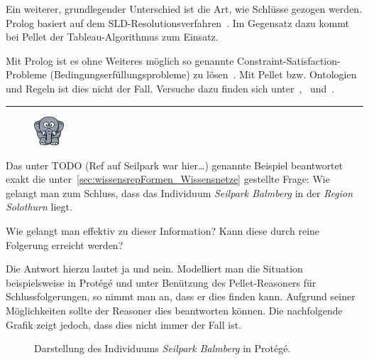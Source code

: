 Ein weiterer, grundlegender Unterschied ist die Art, wie Schlüsse gezogen werden. Prolog basiert auf dem SLD-Resolutionsverfahren~\citep[Details siehe][Seite 68]{laemmel}. Im Gegensatz dazu kommt bei Pellet der Tableau-Algorithmus zum Einsatz.

Mit Prolog ist es ohne Weiteres möglich so genannte Constraint-Satisfaction-Probleme (Bedingungserfüllungsprobleme) zu lösen~\citep[Details siehe][Seite 148]{laemmel}. Mit Pellet bzw. Ontologien und Regeln ist dies nicht der Fall. Versuche dazu finden sich unter~\citet{xiong2008constraint},~\citet{staab2006constraint} und~\citet{bramer2007constraint}.

\noindent\rule[1ex]{\textwidth}{1pt}
\begin{figure}
    \vspace{-12pt}
    \includegraphics[width=0.1\textwidth]{bilder/elephant.png}
\end{figure}
Das unter TODO (Ref auf Seilpark war hier\ldots) genannte Beispiel beantwortet exakt die unter~\ref{sec:wissensrepFormen_Wissensnetze} gestellte Frage: Wie gelangt man zum Schluss, dass das Individuum \textit{Seilpark Balmberg} in der \textit{Region} \textit{Solothurn} liegt.

Wie gelangt man effektiv zu dieser Information? Kann diese durch reine Folgerung erreicht werden?

Die Antwort hierzu lautet ja und nein. Modelliert man die Situation beispielsweise in Protégé und unter Benützung des Pellet-Reasoners für Schlussfolgerungen, so nimmt man an, dass er dies finden kann. Aufgrund seiner Möglichkeiten sollte der Reasoner dies beantworten können. Die nachfolgende Grafik zeigt jedoch, dass dies nicht immer der Fall ist.

\begin{figure}[H]
\centering {}
\caption{Darstellung des Individuums \textit{Seilpark Balmberg} in Protégé.\label{fig:inferenz_protege}\protect\footnotemark}
\end{figure}

